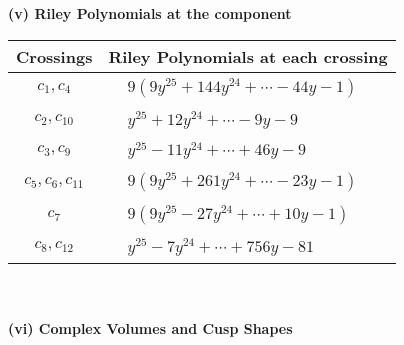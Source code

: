 \documentclass[1p]{elsarticle_modified}
\theoremstyle{definition}
\begin{document}
\newpage\renewcommand{\arraystretch}{1}
\flushleft \textbf{(v) Riley Polynomials at the component}\newline \\
\begin{tabular}{m{50pt}|m{274pt}}
Crossings & \hspace{64pt}Riley Polynomials at each crossing \\
\hline $$\begin{aligned}c_{1},c_{4}\end{aligned}$$&$\begin{aligned}
&9(9 y^{25}+144 y^{24}+\cdots-44 y-1)
\end{aligned}$\\
\hline $$\begin{aligned}c_{2},c_{10}\end{aligned}$$&$\begin{aligned}
&y^{25}+12 y^{24}+\cdots-9 y-9
\end{aligned}$\\
\hline $$\begin{aligned}c_{3},c_{9}\end{aligned}$$&$\begin{aligned}
&y^{25}-11 y^{24}+\cdots+46 y-9
\end{aligned}$\\
\hline $$\begin{aligned}c_{5},c_{6},c_{11}\end{aligned}$$&$\begin{aligned}
&9(9 y^{25}+261 y^{24}+\cdots-23 y-1)
\end{aligned}$\\
\hline $$\begin{aligned}c_{7}\end{aligned}$$&$\begin{aligned}
&9(9 y^{25}-27 y^{24}+\cdots+10 y-1)
\end{aligned}$\\
\hline $$\begin{aligned}c_{8},c_{12}\end{aligned}$$&$\begin{aligned}
&y^{25}-7 y^{24}+\cdots+756 y-81
\end{aligned}$\\
\hline
\end{tabular}\\~\\
\newpage\flushleft \textbf{(vi) Complex Volumes and Cusp Shapes}
\end{document}
